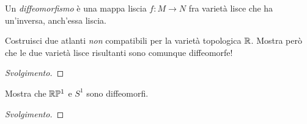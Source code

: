 \documentclass{article}[a4paper, 12pt, italian]
\begin{document}
Un \emph{diffeomorfismo} è una mappa liscia $f: M \to N$ fra varietà lisce
che ha un'inversa, anch'essa liscia.

\begin{exercise}
Costruisci due atlanti \emph{non} compatibili per la varietà topologica $\mathbb{R}$.
Mostra però che le due varietà lisce risultanti sono comunque diffeomorfe!
\begin{proof}[Svolgimento]

\end{proof}
\end{exercise}

\begin{exercise}
Mostra che $\mathbb{R}\mathbb{P}^1$ e $S^1$ sono diffeomorfi.
\begin{proof}[Svolgimento]

\end{proof}
\end{exercise}
\end{document}
